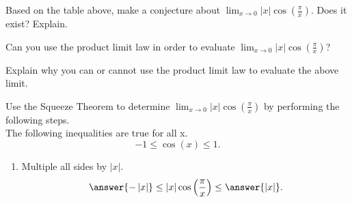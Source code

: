\documentclass{ximera}
\begin{document}
\begin{exercise}
\begin{exercise}
\begin{question}
Based on the table above, make a conjecture about $\lim_{x\to0}\left|x\right|\cos\left(\frac{\pi}{x}\right)$.  Does it exist?  Explain.
\begin{multipleChoice}
\end{multipleChoice}
\end{question}






\begin{exercise}

Can you use the product limit law in order to evaluate $\lim_{x\to0}\left|x\right|\cos\left(\frac{\pi}{x}\right)$?
\begin{multipleChoice}
\end{multipleChoice}

\begin{question}
Explain why you can or cannot use the product limit law to evaluate the above limit.
\end{question}






\begin{exercise}


Use the Squeeze Theorem to determine $\lim_{x\to0}\left|x\right|\cos\left(\frac{\pi}{x}\right)$ by performing the following steps.\\

The following inequalities are true for all x.
\[
-1\leq\cos\left(x\right)\leq1.
\]  
\begin{enumerate}
\item Multiple all sides by $\left|x\right|$. 
\[
\answer{-\left|x\right|}\leq\left|x\right|\cos\left(\frac{\pi}{x}\right)\leq\answer{\left|x\right|}.
\]


\end{enumerate}
\end{exercise}
\end{exercise}
\end{exercise}
\end{exercise}
\end{document}
